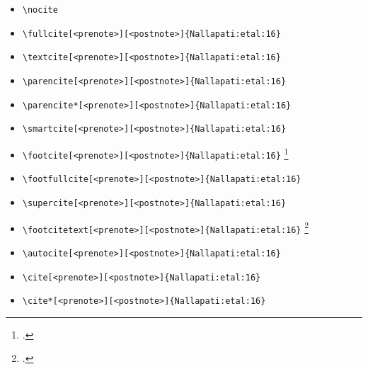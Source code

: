 \documentclass[
12pt,a4paper
]{article}
\begin{document}
\begin{itemize}
\item \verb=\nocite= \nocite{Bech:63}
\item \verb=\fullcite[<prenote>][<postnote>]{Nallapati:etal:16}= \newline  {}
\item \verb=\textcite[<prenote>][<postnote>]{Nallapati:etal:16}= \newline \textcite[<prenote>][<postnote>]{Nallapati:etal:16}
\item \verb=\parencite[<prenote>][<postnote>]{Nallapati:etal:16}= \newline \parencite[<prenote>][<postnote>]{Nallapati:etal:16}
\item \verb=\parencite*[<prenote>][<postnote>]{Nallapati:etal:16}= \newline \parencite*[<prenote>][<postnote>]{Nallapati:etal:16}
\item \verb=\smartcite[<prenote>][<postnote>]{Nallapati:etal:16}= \newline \smartcite[<prenote>][<postnote>]{Nallapati:etal:16}
\item \verb=\footcite[<prenote>][<postnote>]{Nallapati:etal:16}= \newline \footcite[<prenote>][<postnote>]{Nallapati:etal:16}
\item \verb=\footfullcite[<prenote>][<postnote>]{Nallapati:etal:16}= \newline  {}
\item \verb=\supercite[<prenote>][<postnote>]{Nallapati:etal:16}= \newline \supercite[<prenote>][<postnote>]{Nallapati:etal:16}
\item \verb=\footcitetext[<prenote>][<postnote>]{Nallapati:etal:16}= \newline \footcitetext[<prenote>][<postnote>]{Nallapati:etal:16}
\item \verb=\autocite[<prenote>][<postnote>]{Nallapati:etal:16}= \newline  \autocite[<prenote>][<postnote>]{Nallapati:etal:16}
\item \verb=\cite[<prenote>][<postnote>]{Nallapati:etal:16}= \newline  \cite[<prenote>][<postnote>]{Nallapati:etal:16}
\item \verb=\cite*[<prenote>][<postnote>]{Nallapati:etal:16}= \newline  \cite*[<prenote>][<postnote>]{Nallapati:etal:16}

\end{itemize}
\end{document}
